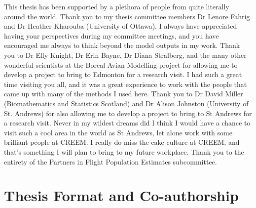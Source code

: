 \par This thesis has been supported by a plethora of people from quite literally around the world. 
Thank you to my thesis committee members Dr Lenore Fahrig and Dr Heather Kharouba (University of Ottawa).
I always have appreciated having your perspectives during my committee meetings, and you have encouraged me always to think beyond the model outputs in my work.
Thank you to Dr Elly Knight, Dr Erin Bayne, Dr Diana Stralberg, and the many other wonderful scientists at the Boreal Avian Modelling project for allowing me to develop a project to bring to Edmonton for a research visit.
I had such a great time visiting you all, and it was a great experience to work with the people that came up with many of the methods I used here.
Thank you to Dr David Miller (Biomathematics and Statistics Scotland) and Dr Alison Johnston (University of St. Andrews) for also allowing me to develop a project to bring to St Andrews for a research visit.
Never in my wildest dreams did I think I would have a chance to visit such a cool area in the world as St Andrews, let alone work with some brilliant people at CREEM.
I really do miss the cake culture at CREEM, and that's something I will plan to bring to my future workplace.
Thank you to the entirety of the Partners in Flight Population Estimates subcommittee.



\chapter*{Thesis Format and Co-authorship}


\lipsum[2]


\clearpage

\tableofcontents

\listoffigures

\listoftables


\label{endfrontmatter} %
